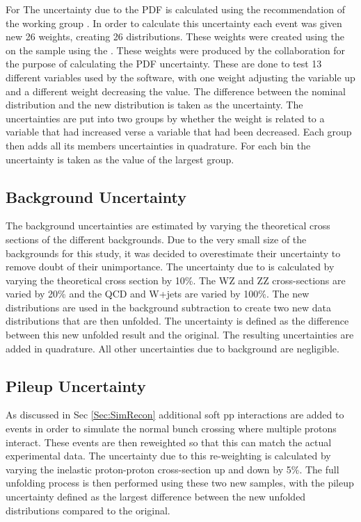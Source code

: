 For \POWHEG The uncertainty due to the PDF is calculated using the recommendation of the  working group  \cite{Botje:2011sn}. In order to calculate this uncertainty each event was given new 26 weights, creating 26 \phistar distributions. These weights were created using the \PDFWeightProducer on the  \POWHEG sample using the  . These weights were produced by the  collaboration for the purpose of calculating the PDF uncertainty. These are done to test 13 different variables used by the software, with one weight adjusting the variable up and a different weight decreasing the value. The difference between the nominal distribution and the new distribution is taken as the uncertainty. The uncertainties are put into two groups by whether the weight is related to a variable that had increased verse a variable that had been decreased. Each group then adds all its members uncertainties in quadrature. For each bin the uncertainty is taken as the value of the largest group.
\fi


\subsection{Background Uncertainty}
The background uncertainties are estimated by varying the theoretical cross sections of the different backgrounds. Due to the very small size of the backgrounds for this study, it was decided to overestimate their uncertainty to remove doubt of their unimportance. The uncertainty due to \ttbar is calculated by varying the theoretical cross section by 10\%. The WZ and ZZ cross-sections are varied by 20\% and the QCD and W+jets are varied by 100\%. The new distributions are used in the background subtraction to create two new data distributions that are then unfolded. The uncertainty is defined as the difference between this new unfolded result and the original. The resulting uncertainties are added in quadrature. All other uncertainties due to background are negligible. 
\subsection{Pileup Uncertainty}
As discussed in Sec \ref{Sec:SimRecon}  additional soft pp interactions are added to events in order to simulate the normal bunch crossing where multiple protons interact. These events are then reweighted so that this can match the actual experimental data. The uncertainty due to this re-weighting is calculated by varying the inelastic proton-proton cross-section up and down by 5\%. The full unfolding process is then performed using these two new samples, with the pileup uncertainty defined as the largest difference between the new unfolded distributions compared to the original.
